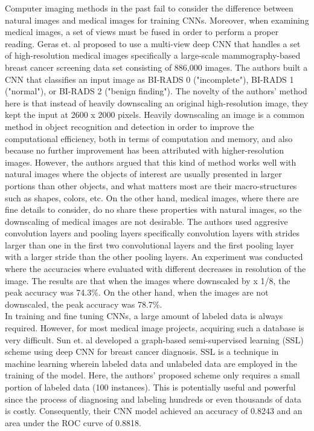 	Computer imaging methods in the past fail to consider the difference between natural images and medical images for training CNNs. Moreover, when examining medical images, a set of views must be fused in order to perform a proper reading. Geras et. al \cite{geras} proposed to use a multi-view deep CNN that handles a set of high-resolution medical images specifically a large-scale mammography-based breast cancer screening data set consisting of 886,000 images. The authors built a CNN that classifies an input image as BI-RADS 0 ("incomplete"), BI-RADS 1 ("normal"), or BI-RADS 2 ("benign finding"). The novelty of the authors' method here is that instead of heavily downscaling an original high-resolution image, they kept the input at 2600 x 2000 pixels. Heavily downscaling an image is a common method in object recognition and detection in order to improve the computational efficiency, both in terms of computation and memory, and also because no further improvement has been attributed with higher-resolution images. However, the authors argued that this kind of method works well with natural images where the objects of interest are usually presented in larger portions than other objects, and what matters most are their macro-structures such as shapes, colors, etc. On the other hand, medical images, where there are fine details to consider, do no share these properties with natural images, so the downscaling of medical images are not desirable. The authors used aggresive convolution layers and pooling layers specifically convolution layers with strides larger than one in the first two convolutional layers and the first pooling layer with a larger stride than the other pooling layers. An experiment was conducted where the accuracies where evaluated with different decreases in resolution of the image. The results are that when the images where downscaled by x 1/8, the peak accuracy was 74.3\%. On the other hand, when the images are not downscaled, the peak accuracy was 78.7\%. \\

	In training and fine tuning CNNs, a large amount of labeled data is always required. However, for most medical image projects, acquiring such a database is very difficult. Sun et. al \cite{sun} developed a graph-based semi-supervised learning (SSL) scheme using deep CNN for breast cancer diagnosis. SSL is a technique in machine learning wherein labeled data and unlabeled data are employed in the training of the model. Here, the authors' proposed scheme only requires a small portion of labeled data (100 instances). This is potentially useful and powerful since the process of diagnosing and labeling hundreds or even thousands of data is costly. Consequently, their CNN model achieved an accuracy of 0.8243 and an area under the ROC curve of 0.8818. \\

